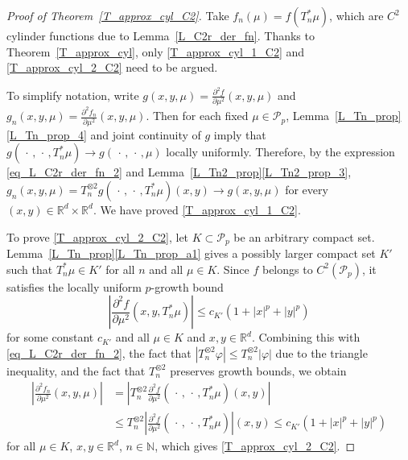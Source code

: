 \documentclass{article}
\theoremstyle{definition}
\numberwithin{equation}{section}
\numberwithin{theorem}{section}
\newcommand{\R}{\mathbb{R}}
\newcommand{\Nb}{\mathbb{N}}
\newcommand{\Pcal}{{\mathcal P}}
\newcommand{\fdot}{{\,\cdot\,}}
\begin{document}
\begin{proof}[Proof of Theorem~\ref{T_approx_cyl_C2}]
Take $f_n(\mu)=f(T_n^*\mu)$, which are $C^2$ cylinder functions due to Lemma~\ref{L_C2r_der_fn}. Thanks to Theorem~\ref{T_approx_cyl}, only \eqref{T_approx_cyl_1_C2} and \eqref{T_approx_cyl_2_C2} need to be argued. 

To simplify notation, write $g(x,y,\mu)=\frac{\partial^2 f}{\partial\mu^2}(x,y,\mu)$ and $g_n(x,y,\mu)=\frac{\partial^2 f_n}{\partial\mu^2}(x,y,\mu)$. Then for each fixed $\mu\in\Pcal_p$, Lemma~\ref{L_Tn_prop}\ref{L_Tn_prop_4} and joint continuity of $g$ imply that $g(\fdot,\fdot,T_n^*\mu)\to g(\fdot,\fdot,\mu)$ locally uniformly. Therefore, by the expression \eqref{eq_L_C2r_der_fn_2} and Lemma~\ref{L_Tn2_prop}\ref{L_Tn2_prop_3}, $g_n(x,y,\mu)=T_n^{\otimes 2}g(\fdot,\fdot,T_n^*\mu)(x,y)\to g(x,y,\mu)$ for every $(x,y)\in\R^d\times\R^d$. We have proved \eqref{T_approx_cyl_1_C2}.

To prove \eqref{T_approx_cyl_2_C2}, let $K \subset \Pcal_p$ be an arbitrary compact set. Lemma~\ref{L_Tn_prop}\ref{L_Tn_prop_a1} gives a possibly larger compact set $K'$ such that $T_n^*\mu\in K'$ for all $n$ and all $\mu\in K$. Since $f$ belongs to $C^2(\Pcal_p)$, it satisfies the locally uniform $p$-growth bound
\[
\left| \frac{\partial^2 f}{\partial\mu^2}(x,y,T_n^*\mu) \right| \le c_{K'} (1+|x|^p+|y|^p)
\]
for some constant $c_{K'}$ and all $\mu \in K$ and $x,y \in {\R^d}$.
Combining this with \eqref{eq_L_C2r_der_fn_2}, the fact that $|T_n^{\otimes 2}\varphi|\le T_n^{\otimes 2}|\varphi|$ due to the triangle inequality, and the fact that $T_n^{\otimes 2}$ preserves growth bounds, we obtain
\begin{align*}
\left|  \frac{\partial^2 f_n}{\partial\mu^2}(x,y,\mu) \right| 
&=\left|T_n^{\otimes 2} \frac{\partial^2f}{\partial\mu^2}(\fdot,\fdot,T_n^*\mu)(x,y)\right|\\
&\le T_n^{\otimes 2} \left|\frac{\partial^2f}{\partial\mu^2}(\fdot,\fdot,T_n^*\mu)\right|(x,y)
\le c_{K'}(1 + |x|^p + |y|^p)
\end{align*}
for all $\mu \in K$, $x,y \in {\R^d}$, $n\in\Nb$, which gives \eqref{T_approx_cyl_2_C2}.
\end{proof}
\end{document}
